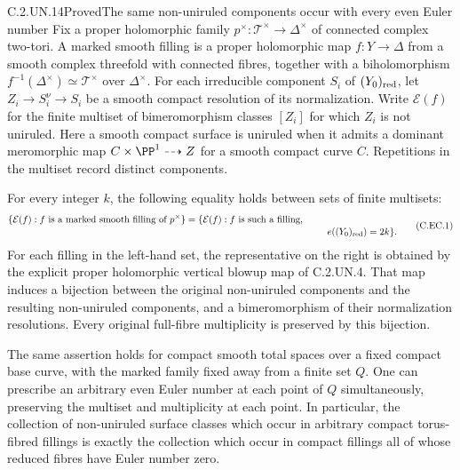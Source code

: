\begin{statement}{C.2.UN.14}{Proved}{The same non-uniruled components occur with every even Euler number}
Fix a proper holomorphic family $p^\times:\mathcal T^\times\to\Delta^\times$
of connected complex two-tori. A marked smooth filling is a proper
holomorphic map $f:Y\to\Delta$ from a smooth complex threefold with
connected fibres, together with a biholomorphism
$f^{-1}(\Delta^\times)\simeq\mathcal T^\times$ over $\Delta^\times$.
For each irreducible component $S_i$ of $(Y_0)_{\rm red}$, let
$Z_i\to S_i^\nu\to S_i$ be a smooth compact resolution of its
normalization. Write $\mathcal E(f)$ for the finite multiset of
bimeromorphism classes $[Z_i]$ for which $Z_i$ is not uniruled.
Here a smooth compact surface is uniruled when it admits a dominant
meromorphic map $C\times\PP^1\dashrightarrow Z$ for a smooth compact
curve $C$. Repetitions in the multiset record distinct components.

For every integer $k$, the following equality holds between sets of
finite multisets:
\[
 \begin{split}
 \{\mathcal E(f): f\text{ is a marked smooth filling of }p^\times\}
 ={}&\{\mathcal E(f): f\text{ is such a filling},\\[-2pt]
 &\hspace{48mm}e((Y_0)_{\rm red})=2k\}.
 \end{split}                                                     \tag{C.EC.1}
\]
For each filling in the left-hand set, the representative on the
right is obtained by the explicit proper holomorphic vertical
blowup map of C.2.UN.4. That map induces a bijection between the
original non-uniruled components and the resulting non-uniruled
components, and a bimeromorphism of their normalization resolutions.
Every original full-fibre multiplicity is preserved by this bijection.

The same assertion holds for compact smooth total spaces over a
fixed compact base curve, with the marked family fixed away from a
finite set $Q$. One can prescribe an arbitrary even Euler number at
each point of $Q$ simultaneously, preserving the multiset and
multiplicity at each point. In particular, the collection of
non-uniruled surface classes which occur in arbitrary compact
torus-fibred fillings is exactly the collection which occur in
compact fillings all of whose reduced fibres have Euler number zero.
\end{statement}
